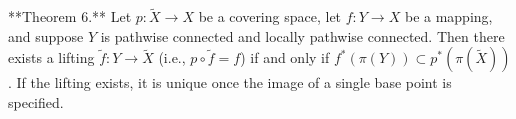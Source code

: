 **Theorem 6.** Let $p: \tilde{X} \to X$ be a covering space, let $f: Y \to X$ be a mapping, and suppose $Y$ is pathwise connected and locally pathwise connected. Then there exists a lifting $\tilde{f}: Y \to \tilde{X}$ (i.e., $p \circ \tilde{f} = f$) if and only if $f^*(\pi(Y)) \subset p^*(\pi(\tilde{X}))$. If the lifting exists, it is unique once the image of a single base point is specified.
